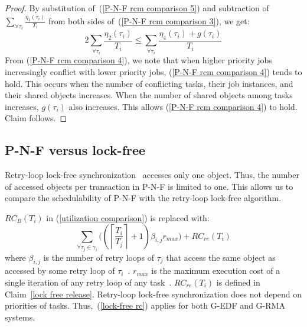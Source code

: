 \begin{proof}
%
By substitution of~(\ref{P-N-F rcm comparison 5}) and subtraction of $\sum_{\forall \tau_i} \frac{\eta_1 (\tau_i)}{T_i}$ from both sides of~(\ref{P-N-F rcm comparison 3}), we get:
%
\begin{equation}
2\sum_{\forall\tau_{i}}\frac{\eta_{2}(\tau_{i})}{T_{i}}\le\sum_{\forall\tau_{i}}\frac{\eta_{4}(\tau_{i})+g(\tau_{i})}{T_{i}}
\label{P-N-F rcm comparison 4}
\end{equation}
%
From (\ref{P-N-F rcm comparison 4}), we note that when higher priority jobs increasingly conflict with lower priority jobs, 
(\ref{P-N-F rcm comparison 4}) tends to hold. This occurs when the number of conflicting tasks, their job instances, and their shared objects increases. 
When the number of shared objects among tasks increases, $g(\tau_{i})$ also increases. This allows (\ref{P-N-F rcm comparison 4}) to
hold. Claim follows.
\end{proof}

\subsection{P-N-F versus lock-free\label{pnf vs lock free sec}}

Retry-loop lock-free synchronization~\cite{key-5,stmconcurrencycontrol:emsoft11} accesses only one object. Thus, the number of accessed objects per transaction in P-N-F is limited to one. This allows us to compare the schedulability of P-N-F with the retry-loop lock-free algorithm. 

$RC_{B}(T_{i})$ in (\ref{utilization comparison}) is replaced with:
%
\begin{equation}
\sum_{\forall\tau_{j}\in\gamma_{i}}\Bigg(\left(\left\lceil \frac{T_{i}}{T_{j}}\right\rceil +1\right)\beta_{i,j}r_{max}\Bigg)+RC_{re}(T_{i})
\label{lock-free rc}
\end{equation}
%
where $\beta_{i,j}$ is the number of retry loops of $\tau_{j}$ that access the same object as accessed by some retry loop of $\tau_{i}$~\cite{key-5}. $r_{max}$ is the maximum execution cost of a single iteration of any retry loop of any task~\cite{key-5}. $RC_{re}(T_i)$ is defined in Claim~\ref{lock free release}. Retry-loop lock-free synchronization does not depend on priorities  of tasks. Thus,~(\ref{lock-free rc}) applies for both G-EDF and G-RMA systems.


